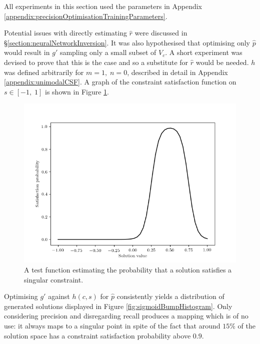 \documentclass[../../main.tex]{subfiles}
\begin{document}
All experiments in this section used the parameters in Appendix \ref{appendix:precisionOptimisationTrainingParameters}.

Potential issues with directly estimating $\hat{r}$ were discussed in \S\ref{section:neuralNetworkInversion}.
It was also hypothesised that optimising only $\hat{p}$ would result in $g'$ sampling only a small subset of $V_c$.
A short experiment was devised to prove that this is the case and so a substitute for $\hat{r}$ would be needed.
$h$ was defined arbitrarily for $m=1,\;n=0$, described in detail in Appendix \ref{appendix:unimodalCSF}.
A graph of the constraint satisfaction function on $s\in[-1,\;1]$ is shown in Figure \ref{fig:sigmoidBumpFunction}.
\begin{figure}[H]
    \begin{center}
    \includegraphics[width=\textwidth]{sigmoidBumpFunction}
    \caption{
        A test function estimating the probability that a solution satisfies a singular constraint.
    }
    \label{fig:sigmoidBumpFunction}
    \end{center}
\end{figure}
Optimising $g'$ against $h(c,s)$ for $\hat{p}$ consistently yields a distribution of generated solutions displayed in Figure \ref{fig:sigmoidBumpHistogram}.
Only considering precision and disregarding recall produces a mapping which is of no use: it always maps to a singular point in spite of the fact that around $15\%$ of the solution space has a constraint satisfaction probability above $0.9$.
\end{document}
